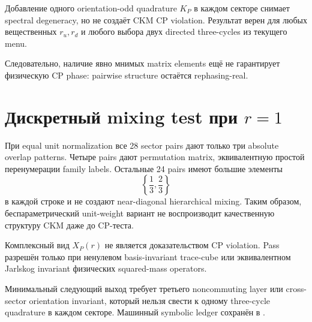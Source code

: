 \begin{theorem}
Добавление одного orientation-odd quadrature \(K_P\) в каждом секторе снимает
spectral degeneracy, но не создаёт CKM CP violation. Результат верен для
любых вещественных \(r_u,r_d\) и любого выбора двух directed three-cycles из
текущего menu.
\end{theorem}

Следовательно, наличие явно мнимых matrix elements ещё не гарантирует
физическую CP phase: pairwise structure остаётся rephasing-real.

\section{Дискретный mixing test при \texorpdfstring{\(r=1\)}{r=1}}

При equal unit normalization все 28 sector pairs дают только три absolute
overlap patterns. Четыре pairs дают permutation matrix, эквивалентную простой
перенумерации family labels. Остальные 24 pairs имеют большие элементы
\begin{equation}
\left\{\frac13,\frac23\right\}
\end{equation}
в каждой строке и не создают near-diagonal hierarchical mixing. Таким
образом, беспараметрический unit-weight вариант не воспроизводит качественную
структуру CKM даже до CP-теста.

\begin{nogocriterion}
Комплексный вид \(X_P(r)\) не является доказательством CP violation. Pass
разрешён только при ненулевом basis-invariant trace-cube или эквивалентном
Jarlskog invariant физических squared-mass operators.
\end{nogocriterion}

Минимальный следующий выход требует третьего noncommuting layer или
cross-sector orientation invariant, который нельзя свести к одному
three-cycle quadrature в каждом секторе. Машинный symbolic ledger сохранён в
.